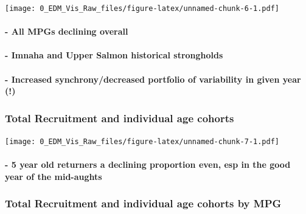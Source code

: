 \documentclass[]{article}
\let\oldparagraph\paragraph
\renewcommand{\paragraph}[1]{\oldparagraph{#1}\mbox{}}
\begin{document}
\texttt{[image: 0\_EDM\_Vis\_Raw\_files/figure-latex/unnamed-chunk-6-1.pdf]}

\hypertarget{all-mpgs-declining-overall}{%
\paragraph{- All MPGs declining
overall}\label{all-mpgs-declining-overall}}

\hypertarget{imnaha-and-upper-salmon-historical-strongholds}{%
\paragraph{- Imnaha and Upper Salmon historical
strongholds}\label{imnaha-and-upper-salmon-historical-strongholds}}

\hypertarget{increased-synchronydecreased-portfolio-of-variability-in-given-year}{%
\paragraph{- Increased synchrony/decreased portfolio of variability in
given year
(!)}\label{increased-synchronydecreased-portfolio-of-variability-in-given-year}}

\hypertarget{total-recruitment-and-individual-age-cohorts}{%
\subsubsection{Total Recruitment and individual age
cohorts}\label{total-recruitment-and-individual-age-cohorts}}

\texttt{[image: 0\_EDM\_Vis\_Raw\_files/figure-latex/unnamed-chunk-7-1.pdf]}

\hypertarget{year-old-returners-a-declining-proportion-even-esp-in-the-good-year-of-the-mid-aughts}{%
\paragraph{- 5 year old returners a declining proportion even, esp in
the good year of the
mid-aughts}\label{year-old-returners-a-declining-proportion-even-esp-in-the-good-year-of-the-mid-aughts}}

\hypertarget{total-recruitment-and-individual-age-cohorts-by-mpg}{%
\subsubsection{Total Recruitment and individual age cohorts by
MPG}\label{total-recruitment-and-individual-age-cohorts-by-mpg}}
\end{document}
